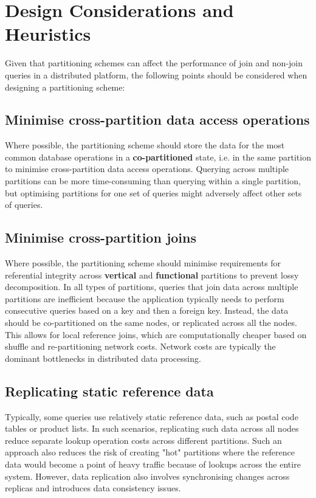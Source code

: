 \section{Design Considerations and Heuristics}
Given that partitioning schemes can affect the performance of join and non-join queries in a distributed platform, the following points should be considered when designing a partitioning scheme:

\subsection{Minimise cross-partition data access operations} 
Where possible, the partitioning scheme should store the data for the most common database operations in a \textbf{co-partitioned} state, i.e. in the same partition to minimise cross-partition data access operations. Querying across multiple partitions can be more time-consuming than querying within a single partition, but optimising partitions for one set of queries might adversely affect other sets of queries. 

\subsection{Minimise cross-partition joins}
Where possible, the partitioning scheme should minimise requirements for referential integrity across \textbf{vertical} and \textbf{functional} partitions to prevent lossy decomposition. In all types of partitions, queries that join data across multiple partitions are inefficient because the application typically needs to perform consecutive queries based on a key and then a foreign key. Instead, the data should be co-partitioned on the same nodes, or replicated across all the nodes. This allows for local reference joins, which are computationally cheaper based on shuffle and re-partitioning network costs. Network costs are typically the dominant bottlenecks in distributed data processing.

\subsection{Replicating static reference data}
Typically, some queries use relatively static reference data, such as postal code tables or product lists. In such scenarios, replicating such data across all nodes reduce separate lookup operation costs across different partitions. Such an approach also reduces the risk of creating "hot" partitions where the reference data would become a point of heavy traffic because of lookups across the entire system. However, data replication also involves synchronising changes across replicas and introduces data consistency issues. 

